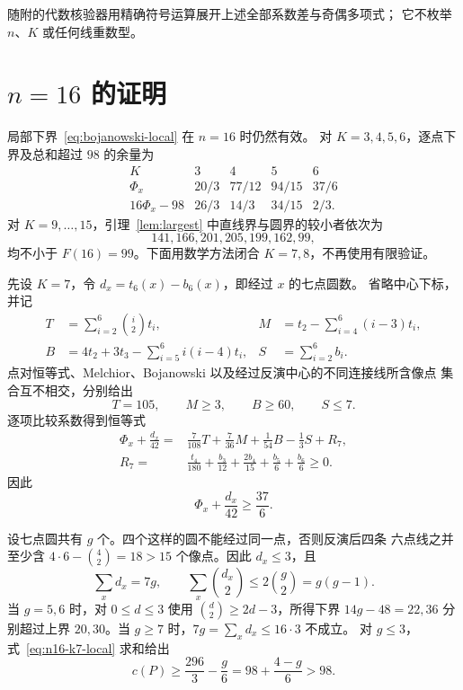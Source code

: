 \documentclass[11pt,a4paper]{ctexart}
\theoremstyle{definition}
\begin{document}
随附的代数核验器用精确符号运算展开上述全部系数差与奇偶多项式；
它不枚举 \(n\)、\(K\) 或任何线重数型。

\section{\texorpdfstring{$n=16$}{n=16} 的证明}
\label{sec:n16}

局部下界~\eqref{eq:bojanowski-local} 在 \(n=16\) 时仍然有效。
对 \(K=3,4,5,6\)，逐点下界及总和超过 \(98\) 的余量为
\[
\begin{array}{c|cccc}
K&3&4&5&6\\ \hline
 \Phi_x&20/3&77/12&94/15&37/6\\
 16\Phi_x-98&26/3&14/3&34/15&2/3.
\end{array}
\]
对 \(K=9,\ldots,15\)，引理~\ref{lem:largest} 中直线界与圆界的较小者依次为
\[
141,166,201,205,199,162,99,
\]
均不小于 \(F(16)=99\)。下面用数学方法闭合 \(K=7,8\)，不再使用有限验证。

先设 \(K=7\)，令 \(d_x=t_6(x)-b_6(x)\)，即经过 \(x\) 的七点圆数。
省略中心下标，并记
\[
\begin{aligned}
 T&=\sum_{i=2}^6\binom i2t_i,&
 M&=t_2-\sum_{i=4}^6(i-3)t_i,\\
 B&=4t_2+3t_3-\sum_{i=5}^6i(i-4)t_i,&
 S&=\sum_{i=2}^6b_i.
\end{aligned}
\]
点对恒等式、Melchior、Bojanowski 以及经过反演中心的不同连接线所含像点
集合互不相交，分别给出
\[
 T=105,\qquad M\ge3,\qquad B\ge60,\qquad S\le7.
\]
逐项比较系数得到恒等式
\begin{equation}\label{eq:n16-k7-identity}
\begin{split}
 \Phi_x+\frac{d_x}{42}
={}&\frac7{108}T+\frac7{36}M+\frac1{54}B-\frac13S+R_7,\\
 R_7={}&\frac{t_4}{180}+\frac{b_3}{12}+\frac{2b_4}{15}
          +\frac{b_5}{6}+\frac{b_6}{6}\ge0.
\end{split}
\end{equation}
因此
\begin{equation}\label{eq:n16-k7-local}
 \Phi_x+\frac{d_x}{42}\ge\frac{37}{6}.
\end{equation}

设七点圆共有 \(g\) 个。四个这样的圆不能经过同一点，否则反演后四条
六点线之并至少含 \(4\cdot6-\binom42=18>15\) 个像点。因此 \(d_x\le3\)，且
\[
 \sum_xd_x=7g,\qquad
 \sum_x\binom{d_x}{2}\le2\binom g2=g(g-1).
\]
当 \(g=5,6\) 时，对 \(0\le d\le3\) 使用
\(\binom d2\ge2d-3\)，所得下界 \(14g-48=22,36\) 分别超过上界
\(20,30\)。当 \(g\ge7\) 时，\(7g=\sum_xd_x\le16\cdot3\) 不成立。
对 \(g\le3\)，式~\eqref{eq:n16-k7-local} 求和给出
\[
 c(P)\ge\frac{296}{3}-\frac g6
       =98+\frac{4-g}{6}>98.
\]
\end{document}

